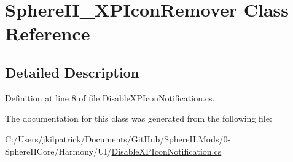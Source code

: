 \hypertarget{class_sphere_i_i___x_p_icon_remover}{}\section{Sphere\+I\+I\+\_\+\+X\+P\+Icon\+Remover Class Reference}
\label{class_sphere_i_i___x_p_icon_remover}


\subsection{Detailed Description}


Definition at line 8 of file Disable\+X\+P\+Icon\+Notification.\+cs.



The documentation for this class was generated from the following file\+:\begin{DoxyCompactItemize}
\item 
C\+:/\+Users/jkilpatrick/\+Documents/\+Git\+Hub/\+Sphere\+I\+I.\+Mods/0-\/\+Sphere\+I\+I\+Core/\+Harmony/\+U\+I/\mbox{\hyperlink{_disable_x_p_icon_notification_8cs}{Disable\+X\+P\+Icon\+Notification.\+cs}}\end{DoxyCompactItemize}
